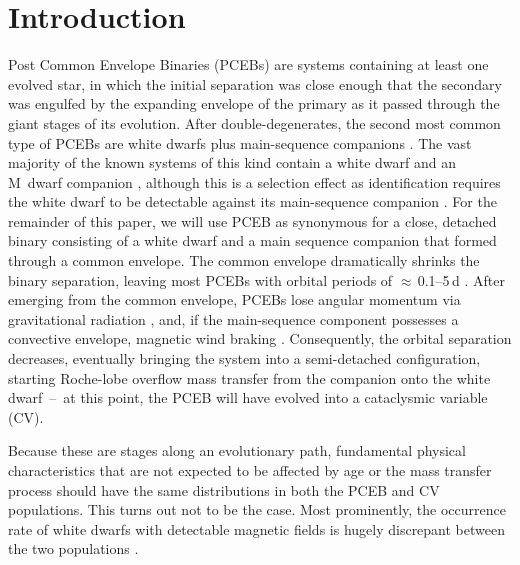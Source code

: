 \documentclass[fleqn,usenatbib]{mnras}
\newcommand{\grout}[1]{\textcolor{lightgray}{#1}}
\begin{document}
\section{Introduction}
Post Common Envelope Binaries (PCEBs) are systems containing at least one evolved star, in which the initial separation was close enough that the secondary was engulfed by the expanding envelope of the primary as it passed through the giant stages of its evolution. After double-degenerates, the second most common type of PCEBs are white dwarfs plus main-sequence companions \citep{toonenetal17-1}. The vast majority of the known systems of this kind contain a white dwarf and an M~dwarf companion \citep{rebassa-mansergasetal10-1}, although this is a selection effect as identification requires the white dwarf to be detectable against its main-sequence companion \citep{inightetal21-1}. For the remainder of this paper, we will use PCEB as synonymous for a close, detached binary consisting of a white dwarf and a main sequence companion that formed through a common envelope. The common envelope dramatically shrinks the binary separation, leaving most PCEBs with orbital periods of $\approx$\,0.1--5\,d \citep{nebotetal11-1}. After emerging from the common envelope, PCEBs lose angular momentum via gravitational radiation \citep{paczynski+sienkiewicz81-1}, and, if the main-sequence component possesses a convective envelope, magnetic wind braking \citep{rappaportetal83-1}. Consequently, the orbital separation decreases, eventually bringing the system into a semi-detached configuration, starting Roche-lobe overflow mass transfer from the companion onto the white dwarf~--~at this point, the PCEB will have evolved into a cataclysmic variable (CV). 



Because these are stages along an evolutionary path, fundamental physical characteristics that are not expected to be affected by age or the mass transfer process should have the same distributions in both the PCEB and CV populations. This turns out not to be the case. Most prominently, the occurrence rate of white dwarfs with detectable magnetic fields is hugely discrepant between the two populations \citep{liebertetal05-2}. 
\end{document}
